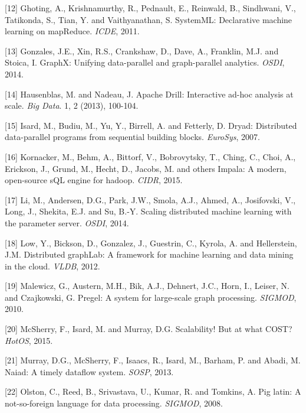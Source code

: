 \documentclass[b5paper,11pt,twoside,openright]{book}
\begin{document}
\leavevmode\hypertarget{ref-systemml}{}%
{[}12{]} Ghoting, A., Krishnamurthy, R., Pednault, E., Reinwald, B.,
Sindhwani, V., Tatikonda, S., Tian, Y. and Vaithyanathan, S. SystemML:
Declarative machine learning on mapReduce. \emph{ICDE}, 2011.

\leavevmode\hypertarget{ref-graphx}{}%
{[}13{]} Gonzales, J.E., Xin, R.S., Crankshaw, D., Dave, A., Franklin,
M.J. and Stoica, I. GraphX: Unifying data-parallel and graph-parallel
analytics. \emph{OSDI}, 2014.

\leavevmode\hypertarget{ref-drill}{}%
{[}14{]} Hausenblas, M. and Nadeau, J. Apache Drill: Interactive ad-hoc
analysis at scale. \emph{Big Data}. 1, 2 (2013), 100-104.

\leavevmode\hypertarget{ref-dryad}{}%
{[}15{]} Isard, M., Budiu, M., Yu, Y., Birrell, A. and Fetterly, D.
Dryad: Distributed data-parallel programs from sequential building
blocks. \emph{EuroSys}, 2007.

\leavevmode\hypertarget{ref-impala}{}%
{[}16{]} Kornacker, M., Behm, A., Bittorf, V., Bobrovytsky, T., Ching,
C., Choi, A., Erickson, J., Grund, M., Hecht, D., Jacobs, M. and others
Impala: A modern, open-source sQL engine for hadoop. \emph{CIDR}, 2015.

\leavevmode\hypertarget{ref-parameterserver}{}%
{[}17{]} Li, M., Andersen, D.G., Park, J.W., Smola, A.J., Ahmed, A.,
Josifovski, V., Long, J., Shekita, E.J. and Su, B.-Y. Scaling
distributed machine learning with the parameter server. \emph{OSDI},
2014.

\leavevmode\hypertarget{ref-graphlab}{}%
{[}18{]} Low, Y., Bickson, D., Gonzalez, J., Guestrin, C., Kyrola, A.
and Hellerstein, J.M. Distributed graphLab: A framework for machine
learning and data mining in the cloud. \emph{VLDB}, 2012.

\leavevmode\hypertarget{ref-pregel}{}%
{[}19{]} Malewicz, G., Austern, M.H., Bik, A.J., Dehnert, J.C., Horn,
I., Leiser, N. and Czajkowski, G. Pregel: A system for large-scale graph
processing. \emph{SIGMOD}, 2010.

\leavevmode\hypertarget{ref-cost}{}%
{[}20{]} McSherry, F., Isard, M. and Murray, D.G. Scalability! But at
what COST? \emph{HotOS}, 2015.

\leavevmode\hypertarget{ref-naiad}{}%
{[}21{]} Murray, D.G., McSherry, F., Isaacs, R., Isard, M., Barham, P.
and Abadi, M. Naiad: A timely dataflow system. \emph{SOSP}, 2013.

\leavevmode\hypertarget{ref-pig}{}%
{[}22{]} Olston, C., Reed, B., Srivastava, U., Kumar, R. and Tomkins, A.
Pig latin: A not-so-foreign language for data processing. \emph{SIGMOD},
2008.
\end{document}
